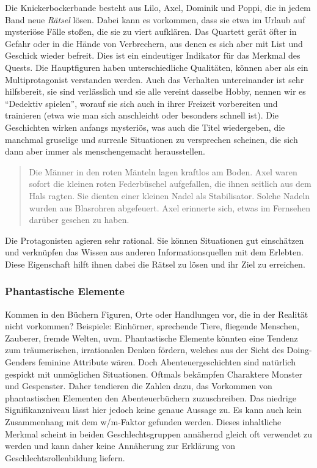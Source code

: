 Die Knickerbockerbande besteht aus Lilo, Axel, Dominik und Poppi, die in
jedem Band neue \emph{Rätsel} lösen. Dabei kann es vorkommen, dass sie
etwa im Urlaub auf mysteriöse Fälle stoßen, die sie zu viert aufklären.
Das Quartett gerät öfter in Gefahr oder in die Hände von Verbrechern,
aus denen es sich aber mit List und Geschick wieder befreit. Dies ist
ein eindeutiger Indikator für das Merkmal des Quests. Die Hauptfiguren
haben unterschiedliche Qualitäten, können aber als ein Multiprotagonist
verstanden werden. Auch das Verhalten untereinander ist sehr
hilfsbereit, sie sind verlässlich und sie alle vereint dasselbe Hobby,
nennen wir es ``Dedektiv spielen'', worauf sie sich auch in ihrer
Freizeit vorbereiten und trainieren (etwa wie man sich anschleicht oder
besonders schnell ist). Die Geschichten wirken anfangs mysteriös, was
auch die Titel wiedergeben, die manchmal gruselige und surreale
Situationen zu versprechen scheinen, die sich dann aber immer als
menschengemacht herausstellen.

\begin{quote}
Die Männer in den roten Mänteln lagen kraftlos am Boden. \textelp{} Axel
waren sofort die kleinen roten Federbüschel aufgefallen, die ihnen
seitlich aus dem Hals ragten. Sie dienten einer kleinen Nadel als
Stabilisator. Solche Nadeln wurden aus Blasrohren abgefeuert. Axel
erinnerte sich, etwas im Fernsehen darüber gesehen zu haben.
\parencite[][117]{Brezina2010}
\end{quote}

Die Protagonisten agieren sehr rational. Sie können Situationen gut
einschätzen und verknüpfen das Wissen aus anderen Informationsquellen
mit dem Erlebten. Diese Eigenschaft hilft ihnen dabei die Rätsel zu
lösen und ihr Ziel zu erreichen.

\subsubsection{Phantastische Elemente}

Kommen in den Büchern Figuren, Orte oder Handlungen vor, die in der
Realität nicht vorkommen? Beispiele: Einhörner, sprechende Tiere,
fliegende Menschen, Zauberer, fremde Welten, uvm. Phantastische Elemente
könnten eine Tendenz zum träumerischen, irrationalen Denken fördern,
welches aus der Sicht des Doing-Genders feminine Attribute wären. Doch
Abenteuergeschichten sind natürlich gespickt mit unmöglichen
Situationen. Oftmals bekämpfen Charaktere Monster und Gespenster. Daher
tendieren die Zahlen dazu, das Vorkommen von phantastischen Elementen
den Abenteuerbüchern zuzuschreiben. Das niedrige Signifikanzniveau lässt
hier jedoch keine genaue Aussage zu. Es kann auch kein Zusammenhang mit
dem w/m-Faktor gefunden werden. Dieses inhaltliche Merkmal scheint in
beiden Geschlechtsgruppen annähernd gleich oft verwendet zu werden und
kann daher keine Annäherung zur Erklärung von Geschlechtsrollenbildung
liefern.

